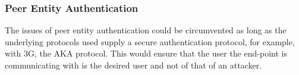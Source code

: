 \subsubsection{Peer Entity Authentication}
The issues of peer entity authentication could be circumvented as long as the underlying protocols used supply a secure authentication protocol, for example, with 3G, the AKA protocol. This would ensure that the user the end-point is communicating with is the desired user and not of that of an attacker.